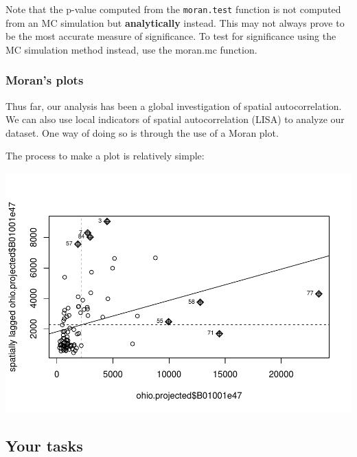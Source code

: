 \documentclass[]{article}
\newenvironment{Shaded}{\begin{snugshade}}{\end{snugshade}}
\newcommand{\AttributeTok}[1]{\textcolor[rgb]{0.13,0.29,0.53}{#1}}
\newcommand{\CommentTok}[1]{\textcolor[rgb]{0.56,0.35,0.01}{\textit{#1}}}
\newcommand{\ConstantTok}[1]{\textcolor[rgb]{0.56,0.35,0.01}{#1}}
\newcommand{\FunctionTok}[1]{\textcolor[rgb]{0.13,0.29,0.53}{\textbf{#1}}}
\newcommand{\NormalTok}[1]{#1}
\newcommand{\SpecialCharTok}[1]{\textcolor[rgb]{0.81,0.36,0.00}{\textbf{#1}}}
\begin{document}
Note that the p-value computed from the \texttt{moran.test} function is
not computed from an MC simulation but \textbf{analytically} instead.
This may not always prove to be the most accurate measure of
significance. To test for significance using the MC simulation method
instead, use the moran.mc function.

\subsubsection{Moran's plots}\label{morans-plots}

Thus far, our analysis has been a global investigation of spatial
autocorrelation. We can also use local indicators of spatial
autocorrelation (LISA) to analyze our dataset. One way of doing so is
through the use of a Moran plot.

The process to make a plot is relatively simple:

\begin{Shaded}
\end{Shaded}

\includegraphics{lab03_files/figure-latex/moranplot-1.pdf}

\subsection{Your tasks}\label{your-tasks}
\end{document}

